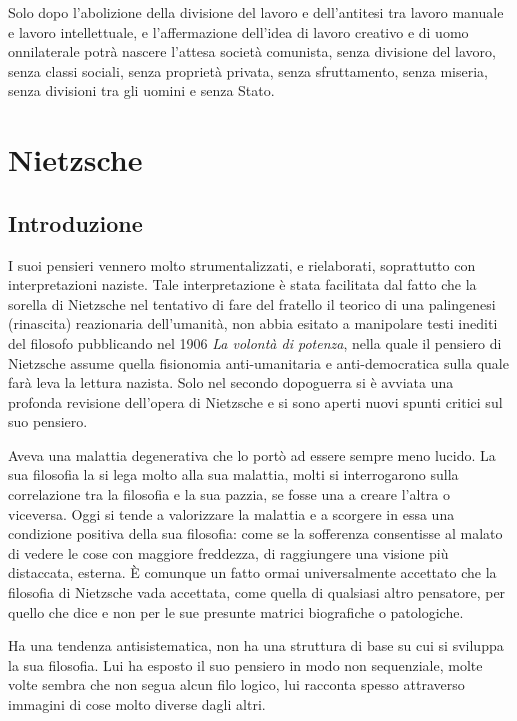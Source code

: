 \documentclass[a4paper, twoside, titlepage]{book}
\begin{document}
Solo dopo l'abolizione della divisione del lavoro e dell'antitesi tra lavoro manuale e lavoro intellettuale, e l'affermazione dell'idea di lavoro creativo e di uomo onnilaterale potrà nascere l'attesa società comunista, senza divisione del lavoro, senza classi sociali, senza proprietà privata, senza sfruttamento, senza miseria, senza divisioni tra gli uomini e senza Stato.


\part{Nietzsche}

\chapter*{Introduzione}

I suoi pensieri vennero molto strumentalizzati, e rielaborati, soprattutto con interpretazioni naziste.
Tale interpretazione è stata facilitata dal fatto che la sorella di Nietzsche nel tentativo di fare del fratello il teorico di una palingenesi (rinascita) reazionaria dell'umanità, non abbia esitato a manipolare testi inediti del filosofo pubblicando nel 1906 \textit{La volontà di potenza}, nella quale il pensiero di Nietzsche assume quella fisionomia anti-umanitaria e anti-democratica sulla quale farà leva la lettura nazista.
Solo nel secondo dopoguerra si è avviata una profonda revisione dell'opera di Nietzsche e si sono aperti nuovi spunti critici sul suo pensiero.

Aveva una malattia degenerativa che lo portò ad essere sempre meno lucido. La sua filosofia la si lega molto alla sua malattia, molti si
interrogarono sulla correlazione tra la filosofia e la sua pazzia, se fosse una a creare l’altra o viceversa.
Oggi si tende a valorizzare la malattia e a scorgere in essa una condizione positiva della sua filosofia: come se la sofferenza consentisse al malato di vedere le cose con maggiore freddezza, di raggiungere una visione più distaccata, esterna.
È comunque un fatto ormai universalmente accettato che la filosofia di Nietzsche vada accettata, come quella di qualsiasi altro pensatore, per quello che dice e non per le sue presunte matrici biografiche o patologiche.

Ha una tendenza antisistematica, non ha una struttura di base su cui si sviluppa la sua filosofia. Lui ha esposto il suo pensiero in modo non sequenziale, molte
volte sembra che non segua alcun filo logico, lui racconta spesso attraverso immagini di cose molto diverse dagli altri.
\end{document}
